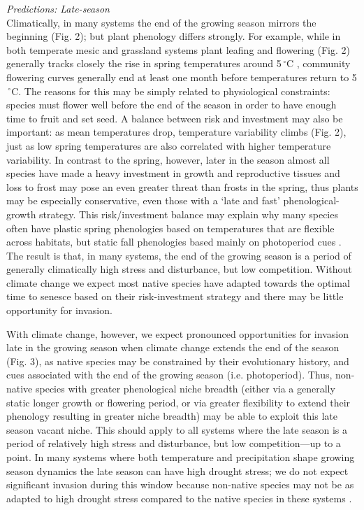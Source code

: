 \documentclass[11pt,a4paper,oneside]{article}
\begin{document}
\noindent \emph{Predictions: Late-season}\\
\noindent Climatically, in many systems the end of the growing season mirrors the beginning (Fig. 2); but plant phenology differs strongly. For example, while in both temperate mesic and grassland systems plant leafing and flowering (Fig. 2) generally tracks closely the rise in spring temperatures around 5$\,^{\circ}\mathrm{C}$  \citep{larcher2003}, community flowering curves generally end at least one month before temperatures return to 5$\,^{\circ}\mathrm{C}$. The reasons for this may be simply related to physiological constraints: species must flower well before the end of the season in order to have enough time to fruit and set seed. A balance between risk and investment may also be important: as mean temperatures drop, temperature variability climbs (Fig. 2), just as low spring temperatures are also correlated with higher temperature variability. In contrast to the spring, however, later in the season almost all species have made a heavy investment in growth and reproductive tissues and loss to frost may pose an even greater threat than frosts in the spring, thus plants may be especially conservative, even those with a `late and fast' phenological-growth strategy. This risk/investment balance may explain why many species often have plastic spring phenologies based on temperatures that are flexible across habitats, but static fall phenologies based mainly on photoperiod cues \citep{Howe:2003}. The result is that, in many systems, the end of the growing season is a period of generally climatically high stress and disturbance, but low competition. Without climate change we expect most native species have adapted towards the optimal time to senesce based on their risk-investment strategy and there may be little opportunity for invasion.

With climate change, however, we expect pronounced opportunities for invasion late in the growing season when climate change extends the end of the season (Fig. 3), as native species may be constrained by their evolutionary history, and cues associated with the end of the growing season (i.e. photoperiod). Thus, non-native species with greater phenological niche breadth (either via a generally static longer growth or flowering period, or via greater flexibility to extend their phenology resulting in greater niche breadth) may be able to exploit this late season vacant niche. This should apply to all systems where the late season is a period of relatively high stress and disturbance, but low competition---up to a point. In many systems where both temperature and precipitation shape growing season dynamics the late season can have high drought stress; we do not expect significant invasion during this window because non-native species may not be as adapted to high drought stress compared to the native species in these systems \citep{alpert2000}.\\
\end{document}
